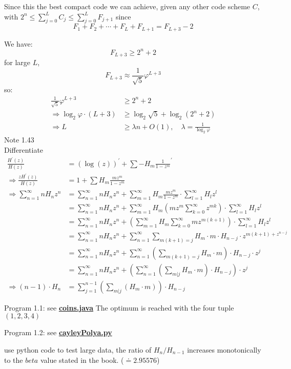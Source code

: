 \documentclass{article}
\newcommand{\myderiv}[1]{#1^\prime}
\newcommand{\mySum}[3]{\ensuremath{\sum_{#1 = #2}^{#3}}}
\begin{document}
Since this the best compact code we can achieve, given any other code scheme $C$, with $2^n \leq \mySum{j}{0}{L} C_j \leq \mySum{j}{0}{L} F_{j+1}$
since 
\[F_1 + F_2 + \cdots + F_{L} + F_{L+1} = F_{L+3} - 2\]

We have:
\[F_{L+3} \geq 2^n + 2\]
for large $L$, \[F_{L+3} \approx \frac{1}{\sqrt{5}}\varphi^{L+3}\]
so:
\begin{align*}
	\frac{1}{\sqrt{5}}\varphi^{L+3} &\geq 2^n + 2 \\
	\Rightarrow \log_2 \varphi \cdot (L + 3) &\geq \log_2 {\sqrt{5}} + \log_2 (2^n + 2) \\
	\Rightarrow L &\geq \lambda n + O(1), \quad \lambda = \frac{1}{\log_2 \varphi}
\end{align*}
Note 1.43\\
Differentiate 
\begin{align*}
	\frac{H^{'}(z)}{H(z)} &= \myderiv{(\log (z))} + \sum \myderiv{-H_m \frac{1}{1-z^m}}\\
	\Rightarrow \frac{zH^\prime(z)}{H(z)} &= 1 + \sum H_m \frac{mz^m}{1 - z^m}\\
	\Rightarrow \sum_{n = 1}^{\infty} nH_n z^n &= \mySum{n}{1}{\infty}  nH_n z^n + \mySum{m}{1}{\infty} H_m \frac{mz^m}{1- z^m} \cdot \sum_{l = 1}^{\infty} H_l z^l \\
	&= \mySum{n}{1}{\infty}  nH_n z^n + \mySum{m}{1}{\infty} H_m (mz^m \mySum{k}{0}{\infty}z^{mk}) \cdot \sum_{l = 1}^{\infty} H_l z^l \\
	&= \mySum{n}{1}{\infty}  nH_n z^n + (\mySum{m}{1}{\infty} H_m \mySum{k}{0}{\infty}mz^{m(k+1)}) \cdot \sum_{l = 1}^{\infty} H_l z^l\\
	&= \mySum{n}{1}{\infty}  nH_n z^n + \mySum{n}{1}{\infty}\sum_{m(k+1) = j} H_m \cdot m \cdot H_{n-j} \cdot z^{m(k+1) + z^{n-j}} \\
	&= \mySum{n}{1}{\infty}  nH_n z^n + \mySum{n}{1}{\infty} (\sum_{m(k+1) = j} H_m \cdot m) \cdot H_{n-j} \cdot z^{j}\\
	&= \mySum{n}{1}{\infty}  nH_n z^n +( \mySum{n}{1}{\infty} (\sum_{m | j} H_m \cdot m) \cdot H_{n-j} ) \cdot z^{j} \\
	\Rightarrow (n-1)\cdot H_n &= \mySum{j}{1}{n-1} (\sum_{m | j} (H_m \cdot m)) \cdot H_{n-j}
\end{align*}

Program 1.1:
see \href{https://gist.github.com/BillMark98/eddc3b98e92649899cdf5618b5e06888}{\textbf{coins.java}}
The optimum is reached with the four tuple $(1,2,3,4)$
	
Program 1.2:
see \href{https://gist.github.com/BillMark98/eddc3b98e92649899cdf5618b5e06888}{\textbf{cayleyPolya.py}}

use python code to test large data, the ratio of $H_n / H_{n-1}$ increases monotonically to the $beta$ value stated in the book. ($ \doteq 2.95576$)
\end{document}
